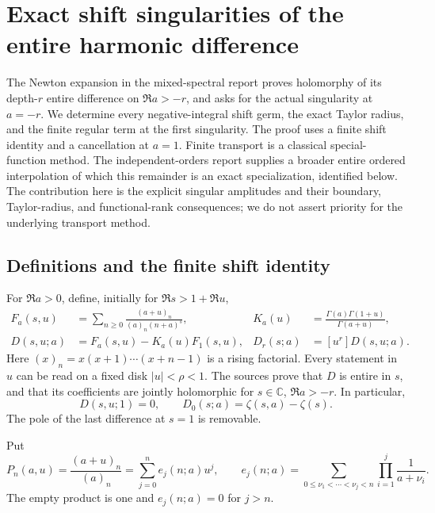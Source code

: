\section{Exact shift singularities of the entire harmonic difference}
\label{hsh:section}

The Newton expansion in the mixed-spectral report \cite{RepoMixed}
proves holomorphy of its depth-$r$ entire difference on $\Re a>-r$,
and asks for the actual singularity at $a=-r$.  We determine every
negative-integral shift germ, the exact Taylor radius, and the finite
regular term at the first singularity.  The proof uses a finite shift
identity and a cancellation at $a=1$.  Finite transport is a classical
special-function method.  The independent-orders report
\cite{RepoIndependent} supplies a broader entire ordered interpolation
of which this remainder is an exact specialization, identified below.
The contribution here is the explicit singular amplitudes and their
boundary, Taylor-radius, and functional-rank consequences; we do not
assert priority for the underlying transport method.

\subsection{Definitions and the finite shift identity}

For $\Re a>0$, define, initially for $\Re s>1+\Re u$,
\begin{align}
 F_a(s,u)&=\sum_{n\geq0}\frac{(a+u)_n}{(a)_n(n+a)^s},
 &K_a(u)&=\frac{\Gamma(a)\Gamma(1+u)}{\Gamma(a+u)},\label{hsh:definitions}\\
 D(s,u;a)&=F_a(s,u)-K_a(u)F_1(s,u),
 &D_r(s;a)&=[u^r]D(s,u;a).\label{hsh:difference}
\end{align}
Here $(x)_n=x(x+1)\cdots(x+n-1)$ is a rising factorial.  Every
statement in $u$ can be read on a fixed disk $|u|<\rho<1$.
The sources \cite{RepoExact,RepoMixed} prove that $D$ is entire in
$s$, and that its coefficients are jointly holomorphic for
$s\in\mathbb C$, $\Re a>-r$.  In particular,
\begin{equation}\label{hsh:basezero}
 D(s,u;1)=0,\qquad D_0(s;a)=\zeta(s,a)-\zeta(s).
\end{equation}
The pole of the last difference at $s=1$ is removable.

Put
\begin{equation}\label{hsh:P}
 P_n(a,u)=\frac{(a+u)_n}{(a)_n}
       =\sum_{j=0}^n e_j(n;a)u^j,
 \qquad
 e_j(n;a)=\sum_{0\leq\nu_1<\cdots<\nu_j<n}
                  \prod_{i=1}^j\frac1{a+\nu_i}.
\end{equation}
The empty product is one and $e_j(n;a)=0$ for $j>n$.

